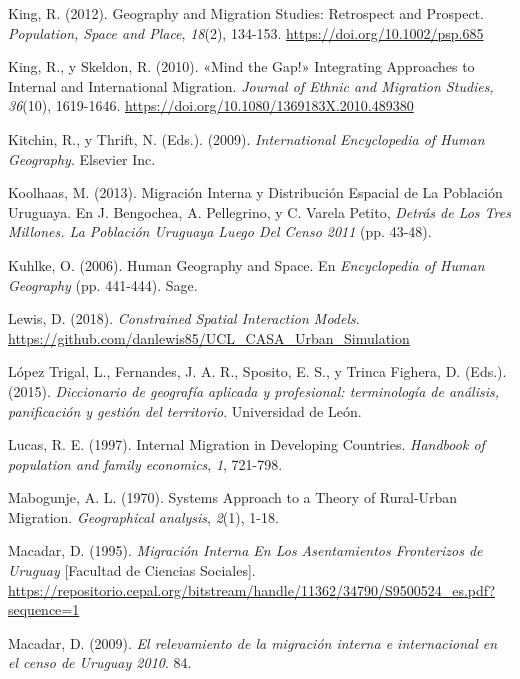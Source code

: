 \documentclass[12pt,spanish,]{article}
\begin{document}
\leavevmode\hypertarget{ref-king2012}{}%
King, R. (2012). Geography and Migration Studies: Retrospect and
Prospect. \emph{Population, Space and Place}, \emph{18}(2), 134-153.
\url{https://doi.org/10.1002/psp.685}

\leavevmode\hypertarget{ref-king2010}{}%
King, R., y Skeldon, R. (2010). «Mind the Gap!» Integrating Approaches
to Internal and International Migration. \emph{Journal of Ethnic and
Migration Studies}, \emph{36}(10), 1619-1646.
\url{https://doi.org/10.1080/1369183X.2010.489380}

\leavevmode\hypertarget{ref-kitchin2009}{}%
Kitchin, R., y Thrift, N. (Eds.). (2009). \emph{International
Encyclopedia of Human Geography}. Elsevier Inc.

\leavevmode\hypertarget{ref-koolhaas2013}{}%
Koolhaas, M. (2013). Migración Interna y Distribución Espacial de La
Población Uruguaya. En J. Bengochea, A. Pellegrino, y C. Varela Petito,
\emph{Detrás de Los Tres Millones. La Población Uruguaya Luego Del Censo
2011} (pp. 43-48).

\leavevmode\hypertarget{ref-kuhlke2006}{}%
Kuhlke, O. (2006). Human Geography and Space. En \emph{Encyclopedia of
Human Geography} (pp. 441-444). Sage.

\leavevmode\hypertarget{ref-lewis2018}{}%
Lewis, D. (2018). \emph{Constrained Spatial Interaction Models}.
\url{https://github.com/danlewis85/UCL_CASA_Urban_Simulation}

\leavevmode\hypertarget{ref-lopeztrigal2015}{}%
López Trigal, L., Fernandes, J. A. R., Sposito, E. S., y Trinca Fighera,
D. (Eds.). (2015). \emph{Diccionario de geografía aplicada y
profesional: terminología de análisis, panificación y gestión del
territorio}. Universidad de León.

\leavevmode\hypertarget{ref-lucas1997}{}%
Lucas, R. E. (1997). Internal Migration in Developing Countries.
\emph{Handbook of population and family economics}, \emph{1}, 721-798.

\leavevmode\hypertarget{ref-mabogunje1970}{}%
Mabogunje, A. L. (1970). Systems Approach to a Theory of Rural-Urban
Migration. \emph{Geographical analysis}, \emph{2}(1), 1-18.

\leavevmode\hypertarget{ref-macadar1995}{}%
Macadar, D. (1995). \emph{Migración Interna En Los Asentamientos
Fronterizos de Uruguay} {[}Facultad de Ciencias Sociales{]}.
\url{https://repositorio.cepal.org/bitstream/handle/11362/34790/S9500524_es.pdf?sequence=1}

\leavevmode\hypertarget{ref-macadar2009}{}%
Macadar, D. (2009). \emph{El relevamiento de la migración interna e
internacional en el censo de Uruguay 2010}. 84.
\end{document}
